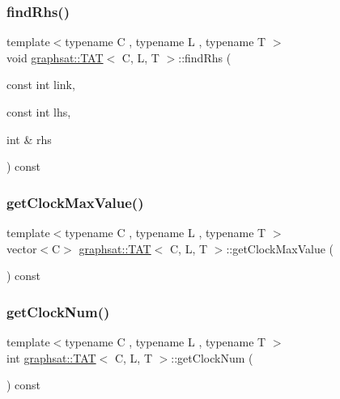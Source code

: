 \subsubsection{\texorpdfstring{findRhs()}{findRhs()}}
{\footnotesize\ttfamily template$<$typename C , typename L , typename T $>$ \\
void \mbox{\hyperlink{classgraphsat_1_1_t_a_t}{graphsat\+::\+T\+AT}}$<$ C, L, T $>$\+::find\+Rhs (\begin{DoxyParamCaption}\item[{const int}]{link,  }\item[{const int}]{lhs,  }\item[{int \&}]{rhs }\end{DoxyParamCaption}) const\hspace{0.3cm}{\ttfamily [inline]}}

\mbox{\label{classgraphsat_1_1_t_a_t_a4a49d6005d30685353f83c672e0a9c89}} 
\subsubsection{\texorpdfstring{getClockMaxValue()}{getClockMaxValue()}}
{\footnotesize\ttfamily template$<$typename C , typename L , typename T $>$ \\
vector$<$C$>$ \mbox{\hyperlink{classgraphsat_1_1_t_a_t}{graphsat\+::\+T\+AT}}$<$ C, L, T $>$\+::get\+Clock\+Max\+Value (\begin{DoxyParamCaption}{ }\end{DoxyParamCaption}) const\hspace{0.3cm}{\ttfamily [inline]}}

\mbox{\label{classgraphsat_1_1_t_a_t_a471392530909266250bcd9cd4d397f48}} 
\subsubsection{\texorpdfstring{getClockNum()}{getClockNum()}}
{\footnotesize\ttfamily template$<$typename C , typename L , typename T $>$ \\
int \mbox{\hyperlink{classgraphsat_1_1_t_a_t}{graphsat\+::\+T\+AT}}$<$ C, L, T $>$\+::get\+Clock\+Num (\begin{DoxyParamCaption}{ }\end{DoxyParamCaption}) const\hspace{0.3cm}{\ttfamily [inline]}}

